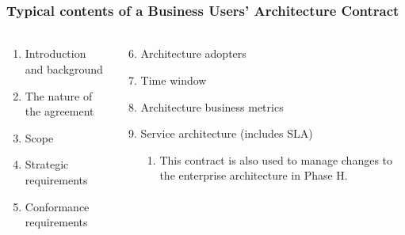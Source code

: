 \documentclass[aspectratio=169, table]{beamer}
\begin{document}
	\begin{frame}
		\frametitle{Typical contents of a Business Users’ Architecture Contract }
		\framesubtitle{\hspace{1cm}}
		\vspace{22pt}
		\begin{columns}[onlytextwidth]
			\begin{column}{0.5\textwidth}
			\begin{enumerate}
				\item Introduction and background
				\item The nature of the agreement
				\item Scope
				\item Strategic requirements
				\item Conformance requirements
			\end{enumerate}
			
				
			\end{column}
			\begin{column}{0.5\textwidth}
				\begin{enumerate}
					\setcounter{enumi}{5}
					\item Architecture adopters
					\item Time window
					\item Architecture business metrics
					\item Service architecture (includes SLA)
					\begin{enumerate}
						\item This contract is also used to manage changes to the enterprise architecture in Phase H.
					\end{enumerate}
				\end{enumerate}
			\end{column}
		\end{columns}
	\end{frame}
	
\end{document}
